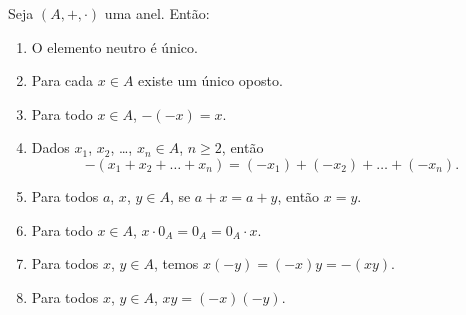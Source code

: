 \begin{proposicao}
	Seja $(A, + , \cdot)$ uma anel. Ent\~ao:
	\begin{enumerate}[label={\roman*})]
		\item O elemento neutro {\'e} {\'u}nico.
		\item Para cada $x \in A$ existe um {\'u}nico oposto.
		\item Para todo $x \in A$, $-(-x) = x$.
		\item Dados $x_{1}$, $x_{2}$, \dots, $x_n \in A$, $n \geqslant 2$, ent{\~a}o
		\[
			-(x_1 + x_2 + \dots + x_n) = (-x_1) + (-x_2) + \dots + (-x_n).
		\]
		\item Para todos $a$, $x$, $y \in A$, se $a + x = a + y$, ent{\~a}o $x = y$.
		\item Para todo $x \in A$, $x\cdot 0_A = 0_A = 0_A\cdot x$.
		\item Para todos $x$, $y \in A$, temos $x(-y) = (-x)y = -(xy)$.
		\item Para todos $x$, $y \in A$, $xy = (-x)(-y)$.
	\end{enumerate}
\end{proposicao}
